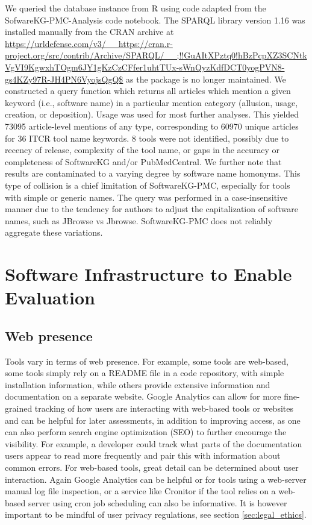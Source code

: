 \documentclass{article}
\begin{document}
We queried the database instance from R using code adapted from the SofwareKG-PMC-Analysis code notebook. The SPARQL library version 1.16 was installed manually from the CRAN archive at \url{https://urldefense.com/v3/__https://cran.r-project.org/src/contrib/Archive/SPARQL/__;!!GuAItXPztq0!hBzPcpXZ3SCNtkVgVI9KgwxhTOgm6JY1gKzCzCFfer1uhtTUx-sWnQyzKdfDCT0yogPVN8-gs4KZy97R-JH4PN6VyojsQgQ$} as the package is no longer maintained. We constructed a query function which returns all articles which mention a given keyword (i.e., software name) in a particular mention category (allusion, usage, creation, or deposition). Usage was used for most further analyses. This yielded 73095 article-level mentions of any type, corresponding to 60970 unique articles for 36 ITCR tool name keywords. 8 tools were not identified, possibly due to recency of release, complexity of the tool name, or gaps in the accuracy or completeness of SoftwareKG and/or PubMedCentral. We further note that results are contaminated to a varying degree by software name homonyms. This type of collision is a chief limitation of SoftwareKG-PMC, especially for tools with simple or generic names. The query was performed in a case-insensitive manner due to the tendency for authors to adjust the capitalization of software names, such as JBrowse vs Jbrowse. SoftwareKG-PMC does not reliably aggregate these variations.



\section{Software Infrastructure to Enable Evaluation}

\subsection{Web presence}
Tools vary in terms of web presence. For example, some tools are web-based, some tools simply rely on a README file in a code repository, with simple installation information, while others provide extensive information and documentation on a separate website. Google Analytics can allow for more fine-grained tracking of how users are interacting with web-based tools or websites and can be helpful for later assessments, in addition to improving access, as one can also perform search engine optimization (SEO) to further encourage the visibility. For example, a developer could track what parts of the documentation users appear to read more frequently and pair this with information about common errors. For web-based tools, great detail can be determined about user interaction. Again Google Analytics can be helpful or for tools using a web-server manual log file inspection, or a service like Cronitor \cite{cronitor}  if the tool relies on a web-based server using cron \cite{cron_2009} job scheduling can also be informative.  It is however important to be mindful of user privacy regulations, see section \ref{sec:legal_ethics}.
\end{document}
